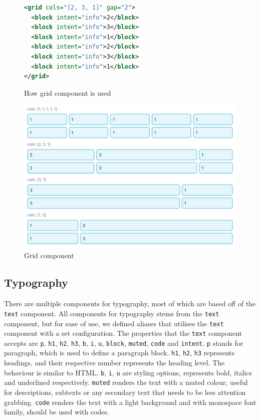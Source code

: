 \begin{figure}
\begin{minipage}{\linewidth}
\begin{lstlisting}[language=xml]
<grid cols="[2, 3, 1]" gap="2">
  <block intent="info">2</block>
  <block intent="info">3</block>
  <block intent="info">1</block>
  <block intent="info">2</block>
  <block intent="info">3</block>
  <block intent="info">1</block>
</grid>
\end{lstlisting}
\end{minipage}
\caption{How grid component is used}%
\label{fig:grid_xml}%
\end{figure}

\begin{figure}
  \centering
  \includegraphics[width=13cm]{thesis/paper/images/grid.png}
  \caption{Grid component}%
  \label{fig:grid}%
\end{figure}

\subsection{Typography}

There are multiple components for typography, most of which are based off of the \texttt{text} component. All components for typography stems from the \texttt{text} component, but for ease of use, we defined aliases that utilises the \texttt{text} component with a set configuration. The properties that the \texttt{text} component accepts are \texttt{p}, \texttt{h1}, \texttt{h2}, \texttt{h3}, \texttt{b}, \texttt{i}, \texttt{u}, \texttt{block}, \texttt{muted}, \texttt{code} and \texttt{intent}. \texttt{p} stands for paragraph, which is used to define a paragraph block. \texttt{h1}, \texttt{h2}, \texttt{h3} represents headings, and their respective number represents the heading level. The behaviour is similar to HTML. \texttt{b}, \texttt{i}, \texttt{u} are styling options, represents bold, italics and underlined respectively. \texttt{muted} renders the text with a muted colour, useful for descriptions, subtexts or any secondary text that needs to be less attention grabbing. \texttt{code} renders the text with a light background and with monospace font family, should be used with codes. 

